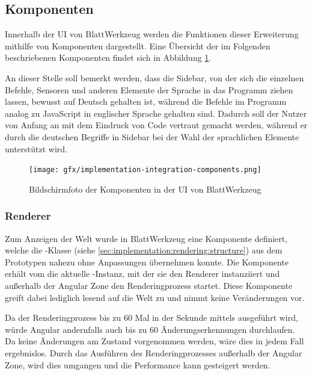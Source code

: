 \subsection{Komponenten}
\label{sec:implementation:integration:components}

Innerhalb der UI von BlattWerkzeug werden die Funktionen dieser Erweiterung mithilfe von Komponenten dargestellt. Eine Übersicht der im Folgenden beschriebenen Komponenten findet sich in Abbildung \ref{fig:implementation:integration:components}.

An dieser Stelle soll bemerkt werden, dass die Sidebar, von der sich die einzelnen Befehle, Sensoren und anderen Elemente der Sprache in das Programm ziehen lassen, bewusst auf Deutsch gehalten ist, während die Befehle im Programm analog zu JavaScript in englischer Sprache gehalten sind. Dadurch soll der Nutzer von Anfang an mit dem Eindruck von Code vertraut gemacht werden, während er durch die deutschen Begriffe in Sidebar bei der Wahl der sprachlichen Elemente unterstützt wird.

\begin{figure}
  \centering
  \texttt{[image: gfx/implementation-integration-components.png]}
  \caption{Bildschirmfoto der Komponenten in der UI von BlattWerkzeug}
  \label{fig:implementation:integration:components}
\end{figure}

\subsubsection{Renderer}
\label{sec:implementation:integration:renderer}

Zum Anzeigen der Welt wurde in BlattWerkzeug eine Komponente definiert, welche die -Klasse (siehe \ref{sec:implementation:rendering:structure}) aus dem Prototypen nahezu ohne Anpassungen übernehmen konnte. Die Komponente erhält vom  die aktuelle -Instanz, mit der sie den Renderer instanziiert und außerhalb der Angular Zone den Renderingprozess startet. Diese Komponente greift dabei lediglich lesend auf die Welt zu und nimmt keine Veränderungen vor.

Da der Renderingprozess bis zu 60 Mal in der Sekunde mittels  ausgeführt wird, würde Angular andernfalls auch bis zu 60 Änderungserkennungen durchlaufen. Da keine Änderungen am Zustand vorgenommen werden, wäre dies in jedem Fall ergebnislos. Durch das Ausführen des Renderingprozesses außerhalb der Angular Zone, wird dies umgangen und die Performance kann gesteigert werden.

